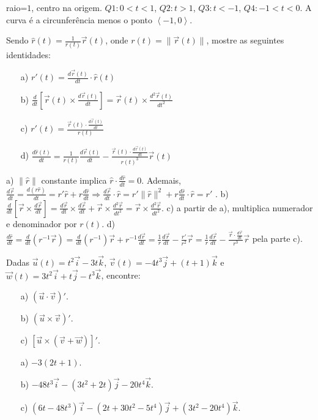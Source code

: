 \begin{resp}raio=$1$, centro na origem. $Q1: 0<t<1$, $Q2:t>1$, $Q3:t<-1$, $Q4:-1<t<0$. A curva é a circunferência menos o ponto $\left<-1,0\right>$.
\end{resp}

\begin{exer}
Sendo $\hat{r}(t)=\frac{1}{r(t)} \vec{r}(t)$, onde $r(t)=\|\vec{r}(t)\|$,  mostre as seguintes identidades:
\begin{itemize}
\item[a)] $\displaystyle r'(t) = \frac{d\vec{r}(t)}{dt}\cdot \hat{r}(t)$
\item[b)] $\displaystyle \frac{d}{dt}\left[\vec{r}(t)\times\frac{d\vec{r}(t)}{dt}\right]=\vec{r}(t)\times\frac{d^2\vec{r}(t)}{dt^2}$ 
\item[c)] $\displaystyle r'(t)=\frac{\vec{r}(t)\cdot\frac{d\vec{r}(t)}{dt}}{r(t)}$ 
\item[d)] $\displaystyle \frac{d\hat{r}(t)}{dt}=\frac{1}{r(t)} \frac{d\vec{r}(t)}{dt}-\frac{\vec{r}(t)\cdot\frac{d\vec{r}(t)}{dt}}{r(t)^3} \vec{r}(t)$
\end{itemize}
\end{exer}
\begin{resp}
a) $\|\hat{r}\|$ constante implica $\hat{r} \cdot \frac{d\hat{r}}{dt}=0$. Ademais, $ \frac{d\vec{r}}{dt} = \frac{d(r \hat{r})}{dt} = r' \hat{r} + r \frac{d\hat{r}}{dt} \Rightarrow \frac{d\vec{r}}{dt} \cdot \hat{r} = 
r' \|\hat{r}\|^2 + r \frac{d\hat{r}}{dt} \cdot \hat{r} = r' $ 
. b) $\frac{d}{dt} \left[ \vec{r} \times \frac{d\vec{r}}{dt} \right] =
\frac{d \vec{r}}{dt} \times \frac{d \vec{r}}{dt} + \vec{r} \times \frac{d^2 \vec{r}}{dt^2} = \vec{r} \times \frac{d^2 \vec{r}}{dt^2} $. c) a partir de a), multiplica numerador e denominador por $r(t)$. d) $\frac{d\hat{r}}{dt} = 
\frac{d}{dt} \left( r^{-1} \vec{r} \right) = \frac{d}{dt} \left( r^{-1} \right) \vec{r} + r^{-1} \frac{d \vec{r}}{dt} = \frac{1}{r} \frac{d\vec{r}}{dt} - \frac{r'}{r^2} \vec{r} = \frac{1}{r} \frac{d \vec{r}}{dt} - \frac{ \vec{r} \cdot \frac{d \vec{r}}{dt} }{r^3} \vec{r} $ pela parte c). 
\end{resp}
\begin{exer}Dadas $\vec{u}(t)=t^2\vec{i}-3t\vec{k}$, $\vec{v}(t)=-4t^3\vec{j}+(t+1)\vec{k}$ e $\vec{w}(t)=3t^2\vec{i}+t\vec{j}-t^3\vec{k}$, encontre:
\begin{itemize}
 \item[a)] $(\vec{u}\cdot \vec{v})'$.
 \item[b)] $(\vec{u}\times \vec{v})'$.
 \item[c)] $\left[\vec{u}\times (\vec{v}+\vec{w})\right]'$.
\end{itemize}
\end{exer}
\begin{resp}
\begin{itemize}
 \item[a)] $-3(2t+1)$.
 \item[b)] $-48t^3\vec{i}-(3t^2+2t)\vec{j}-20t^4\vec{k}$.
 \item[c)] $(6t-48t^3)\vec{i}-(2t+30t^2-5t^4)\vec{j}+(3t^2-20t^4)\vec{k}$.
\end{itemize} 
\end{resp}
